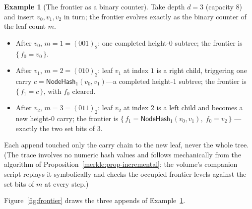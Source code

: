 \documentclass[11pt,a4paper]{article}
\theoremstyle{definition}
\newtheorem{example}[theorem]{Example}
\theoremstyle{remark}
\begin{document}
\begin{example}[The frontier as a binary counter]
\label{merkle:exp-frontier}
Take depth \(d = 3\) (capacity \(8\)) and insert \(v_0, v_1, v_2\) in
turn; the frontier evolves exactly as the binary counter of the leaf
count \(m\).
\begin{itemize}
\item After \(v_0\), \(m = 1 = (001)_2\): one completed height-\(0\)
  subtree; the frontier is \(\{\, f_0 = v_0 \,\}\).
\item After \(v_1\), \(m = 2 = (010)_2\): leaf \(v_1\) at index \(1\)
  is a right child, triggering one carry
  \(c = \mathsf{NodeHash}_1(v_0, v_1)\)---a completed height-\(1\)
  subtree; the frontier is \(\{\, f_1 = c \,\}\), with \(f_0\)
  cleared.
\item After \(v_2\), \(m = 3 = (011)_2\): leaf \(v_2\) at index \(2\)
  is a left child and becomes a new height-\(0\) carry; the frontier
  is \(\{\, f_1 = \mathsf{NodeHash}_1(v_0, v_1),\; f_0 = v_2 \,\}\)
  ---exactly the two set bits of \(3\).
\end{itemize}
Each append touched only the carry chain to the new leaf, never the
whole tree. (The trace involves no numeric hash values and follows
mechanically from the algorithm of
Proposition~\ref{merkle:prop-incremental}; the volume's companion
script replays it symbolically and checks the occupied frontier
levels against the set bits of \(m\) at every step.)
\end{example}

Figure~\ref{fig:frontier} draws the three appends of
Example~\ref{merkle:exp-frontier}.
\end{document}
